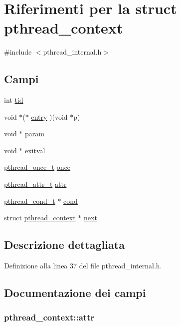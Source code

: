 \hypertarget{structpthread__context}{\section{Riferimenti per la struct pthread\+\_\+context}
\label{structpthread__context}
}


{\ttfamily \#include $<$pthread\+\_\+internal.\+h$>$}

\subsection*{Campi}
\begin{DoxyCompactItemize}
\item 
int \hyperlink{structpthread__context_a5b7aa396dbf3c140b1a54f09568c8253}{tid}
\item 
void $\ast$($\ast$ \hyperlink{structpthread__context_a688eabe4cd81d34bed6c73abd442f54a}{entry} )(void $\ast$p)
\item 
void $\ast$ \hyperlink{structpthread__context_afb0244aa84b0403cc0df2cd6ebdb94b4}{param}
\item 
void $\ast$ \hyperlink{structpthread__context_ab2848ec5b075681f217e57545f986c1b}{exitval}
\item 
\hyperlink{pthread_8h_a18773caa8d79a98514e4291b855c3d80}{pthread\+\_\+once\+\_\+t} \hyperlink{structpthread__context_a33f7f059b1d0cda2a8675d13600b6dd2}{once}
\item 
\hyperlink{pthread_8h_ae242a79436919ba1cd46e38598bc17e7}{pthread\+\_\+attr\+\_\+t} \hyperlink{structpthread__context_a63e797747884670222fc0ea6fdf801fd}{attr}
\item 
\hyperlink{pthread_8h_a3fca5856f6b33b80711e4942c1e33a61}{pthread\+\_\+cond\+\_\+t} $\ast$ \hyperlink{structpthread__context_ace03687a8a5dc35db9e23fdc96bf0667}{cond}
\item 
struct \hyperlink{structpthread__context}{pthread\+\_\+context} $\ast$ \hyperlink{structpthread__context_a876fe0d5cfa5b9886c90e5936b98f992}{next}
\end{DoxyCompactItemize}


\subsection{Descrizione dettagliata}


Definizione alla linea 37 del file pthread\+\_\+internal.\+h.



\subsection{Documentazione dei campi}
\hypertarget{structpthread__context_a63e797747884670222fc0ea6fdf801fd}{
\subsubsection[{attr}]{ pthread\+\_\+context\+::attr}}\label{structpthread__context_a63e797747884670222fc0ea6fdf801fd}


